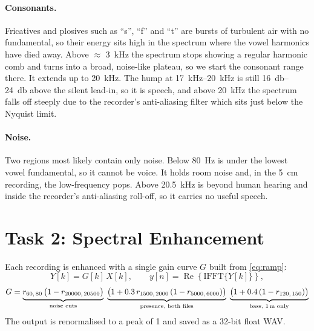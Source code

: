 \documentclass[11pt,a4paper]{article}
\newcommand{\ramp}[2]{r_{#1,\,#2}}
\begin{document}
\paragraph{Consonants.}
Fricatives and plosives such as ``s'', ``f'' and ``t'' are bursts of turbulent
air with no fundamental, so their energy sits high in the spectrum where the
vowel harmonics have died away. Above $\approx$ \SI{3}{\kilo\hertz} the spectrum
stops showing a regular harmonic comb and turns into a broad, noise-like
plateau, so we start the consonant range there. It extends up to
\SI{20}{\kilo\hertz}. The hump at \SIrange{17}{20}{\kilo\hertz} is still
\SIrange{16}{24}{\decibel} above the silent lead-in, so it is speech, and above
\SI{20}{\kilo\hertz} the spectrum falls off steeply due to the recorder's anti-aliasing filter which sits just below the Nyquist limit.

\paragraph{Noise.}
Two regions most likely contain only noise. Below \SI{80}{\hertz} is under
the lowest vowel fundamental, so it cannot be voice. It holds room noise and,
in the \SI{5}{\centi\metre} recording, the low-frequency pops. Above \SI{20.5}{\kilo\hertz} is beyond human hearing and inside the
recorder's anti-aliasing roll-off, so it carries no useful speech.

\section*{Task 2: Spectral Enhancement}
\label{sec:task2}\label{sec:enhance}

Each recording is enhanced with a single gain curve $G$ built from
\cref{eq:ramp}:
\begin{equation}
  Y[k] = G[k]\,X[k],
  \qquad
  y[n] = \operatorname{Re}\!\left\{\mathrm{IFFT}\{Y[k]\}\right\},
  \label{eq:filter}
\end{equation}
\begin{equation}
  G =
  \underbrace{\ramp{60}{80}\,\bigl(1-\ramp{20000}{20500}\bigr)}_{\text{noise cuts}}
  \;\underbrace{\bigl(1 + 0.3\,\ramp{1500}{2000}\,(1-\ramp{5000}{6000})\bigr)}_{\text{presence, both files}}
  \;\underbrace{\bigl(1 + 0.4\,(1-\ramp{120}{150})\bigr)}_{\text{bass, \SI{1}{\metre} only}}
  \label{eq:gain}
\end{equation}
The output is renormalised to a peak of 1 and saved as a 32-bit float WAV.
\end{document}
